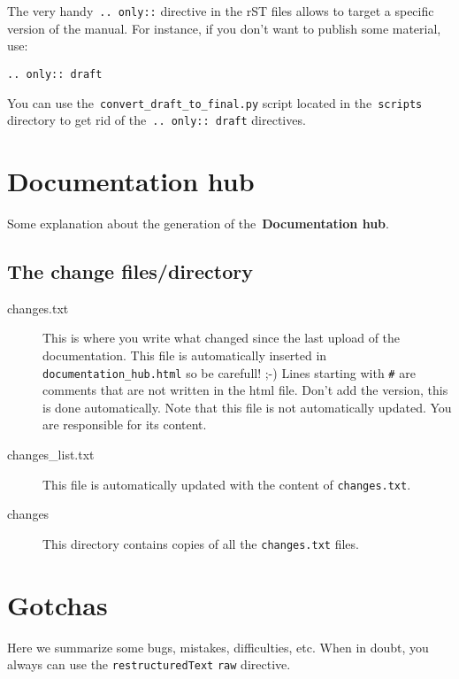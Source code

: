 \documentclass[a4paper,10pt]{article}
\newcommand{\code}[1]{\texttt{#1}}
\newcommand{\dhub}{{\bf Documentation hub}}
\begin{document}
The very handy~\code{..  only::} directive in the rST files allows to target a specific version of the manual. For instance, if you don't want
to publish some material, use:
\begin{center}
\code{..	only:: draft}
\end{center}

You can use the~\code{convert\_draft\_to\_final.py} script located in the~\code{scripts} directory to get rid of the~\code{..	only:: draft} directives.

\section{\dhub}

Some explanation about the generation of the~\dhub.
\subsection{The change files/directory}

\begin{description}
 \item[changes.txt] This is where you write what changed since the last upload of the documentation. This file is automatically inserted in \verb+documentation_hub.html+ so be carefull! ;-) Lines starting with \verb+#+ are comments that are not written in the html file. Don't add the version, this is done automatically. Note that this file is not automatically updated. You are responsible for its content.
 \item[changes\_list.txt] This file is automatically updated with the content of \verb+changes.txt+.
 \item[changes] This directory contains copies of all the \verb+changes.txt+ files.
 \end{description}




\section{Gotchas}

Here we summarize some bugs, mistakes, difficulties, etc. When in doubt, you always can use the \code{restructuredText}
\code{raw} directive.
\end{document}

